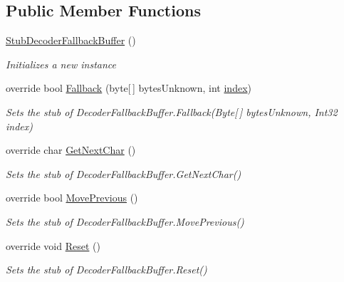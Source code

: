 \subsection*{Public Member Functions}
\begin{DoxyCompactItemize}
\item 
\hyperlink{class_system_1_1_text_1_1_fakes_1_1_stub_decoder_fallback_buffer_a2f956a17187d85944dfb2ae44dac11e2}{Stub\-Decoder\-Fallback\-Buffer} ()
\begin{DoxyCompactList}\small\item\em Initializes a new instance\end{DoxyCompactList}\item 
override bool \hyperlink{class_system_1_1_text_1_1_fakes_1_1_stub_decoder_fallback_buffer_a453c1ead1e6d0e637f46d7c50d288861}{Fallback} (byte\mbox{[}$\,$\mbox{]} bytes\-Unknown, int \hyperlink{jquery-1_810_82-vsdoc_8js_a75bb12d1f23302a9eea93a6d89d0193e}{index})
\begin{DoxyCompactList}\small\item\em Sets the stub of Decoder\-Fallback\-Buffer.\-Fallback(\-Byte\mbox{[}$\,$\mbox{]} bytes\-Unknown, Int32 index)\end{DoxyCompactList}\item 
override char \hyperlink{class_system_1_1_text_1_1_fakes_1_1_stub_decoder_fallback_buffer_aeb6ee6bd8399631b8c31ff78d66bb0dd}{Get\-Next\-Char} ()
\begin{DoxyCompactList}\small\item\em Sets the stub of Decoder\-Fallback\-Buffer.\-Get\-Next\-Char()\end{DoxyCompactList}\item 
override bool \hyperlink{class_system_1_1_text_1_1_fakes_1_1_stub_decoder_fallback_buffer_a28fe4bd9c88a3e407f0c16e5ad87ae73}{Move\-Previous} ()
\begin{DoxyCompactList}\small\item\em Sets the stub of Decoder\-Fallback\-Buffer.\-Move\-Previous()\end{DoxyCompactList}\item 
override void \hyperlink{class_system_1_1_text_1_1_fakes_1_1_stub_decoder_fallback_buffer_a9a20e740c76bfb557b7763c50e75fce5}{Reset} ()
\begin{DoxyCompactList}\small\item\em Sets the stub of Decoder\-Fallback\-Buffer.\-Reset()\end{DoxyCompactList}\end{DoxyCompactItemize}
